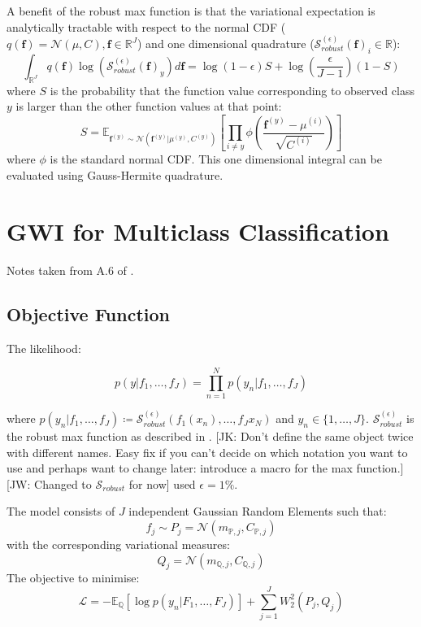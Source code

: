 \documentclass[twoside,11pt]{article}
\newcommand{\jk}[1]{{\color{blue} [JK: #1]}}
\newcommand{\jw}[1]{{\color{gray} [JW: #1]}}
\begin{document}
A benefit of the robust max function is that the variational expectation is analytically tractable with respect to the normal CDF ($q(\mathbf{f}) = \mathcal{N}(\mu, C), \mathbf{f} \in \mathbb{R}^J$) and one dimensional quadrature ($\mathcal{S}_{robust}^{(\epsilon)}(\mathbf{f})_i \in \mathbb{R}$):
\[\int_{\mathbb{R}^J} q(\mathbf{f}) \log(\mathcal{S}_{robust}^{(\epsilon)}(\mathbf{f})_y) d\textbf{f} = \log(1-\epsilon) S + \log\left(\frac{\epsilon}{J-1}\right)(1-S)\]
where $S$ is the probability that the function value corresponding to observed class $y$ is larger than the other function values at that point:
\[S = \mathbb{E}_{\mathbf{f}^{(y)} \sim \mathcal{N}(\mathbf{f}^{(y)} | \mu^{(y)}, C^{(y)})} \left[\prod_{i \neq y} \phi \left(\frac{\textbf{f}^{(y)}-\mu^{(i)}}{\sqrt{C^{(i)}}} \right)\right]\]
where $\phi$ is the standard normal CDF. This one dimensional integral can be evaluated using Gauss-Hermite quadrature.


\section{GWI for Multiclass Classification}\label{sec:gwi-for-multiclass-classification}
Notes taken from A.6 of \cite{wild2022generalized}.

\subsection{Objective Function}\label{subsec:gwi-for-multiclass-classification-objective-function}

The likelihood:

\[p(y|f_1, \dots, f_J) = \prod_{n=1}^N p(y_n | f_1, \dots, f_J)\]

where $p(y_n | f_1, \dots, f_J) \coloneqq \mathcal{S}_{robust}^{(\epsilon)}(f_1(x_n), \dots , f_J{x_N})$ and $y_n \in \{1, \dots, J\}$.
$\mathcal{S}_{robust}^{(\epsilon)}$ is the robust max function as described in \cite{matthews2017scalable}.
%
\jk{Don't define the same object twice with different names. Easy fix if you can't decide on which notation you want to use and perhaps want to change later: introduce a macro for the max function.}
%
%
\jw{Changed to $\mathcal{S}_{robust}$ for now}
%
\cite{wild2022generalized} used $\epsilon = 1 \%$.

The model consists of $J$ independent Gaussian Random Elements such that:
\[f_j \sim P_j = \mathcal{N}(m_{\mathbb{P}, j}, C_{\mathbb{P}, j})\]
with the corresponding variational measures:
\[Q_j = \mathcal{N}(m_{\mathbb{Q}, j}, C_{\mathbb{Q}, j})\]
The objective to minimise:
\[\mathcal{L} = -\mathbb{E}_{\mathbb{Q}}\left[ \log p(y_n | F_1, \dots, F_J)\right] + \sum_{j=1}^{J} W_2^2(P_j, Q_j)\]
\end{document}
